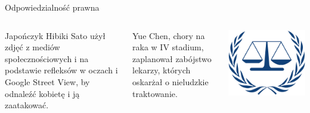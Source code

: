 \begin{frame}{Odpowiedzialność prawna}
    \begin{columns}[c]
      \begin{block}{}
        Japończyk Hibiki Sato użył zdjęć z mediów społecznościowych i na podstawie refleksów w oczach i Google Street View, by odnaleźć kobietę i ją zaatakować.
      \end{block}
      \begin{block}{}
        Yue Chen, chory na raka w IV stadium, zaplanował zabójstwo lekarzy, których oskarżał o nieludzkie traktowanie.
      \end{block}
      \includegraphics[width=1\textwidth]{images/law.png}
  \end{columns}
\end{frame}